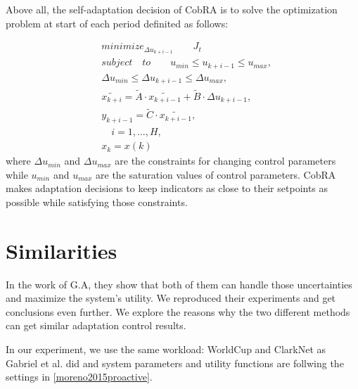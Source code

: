 \documentclass[sigconf]{acmart}
\begin{document}
Above all, the self-adaptation decision of CobRA is to solve the optimization problem at start of each period definited as follows:

\begin{equation}
\begin{aligned}
&minimize_{\Delta u_{k+i-1}}\qquad J_t \\
&subject\quad to \qquad u_{min}\leq u_{k+i-1}\leq u_{max},\\
&{\Delta u_{min}}\leq{ \Delta u_{k+i-1}}\leq {\Delta u_{max}},\\
&\tilde{x_{k+i}}=\tilde{A}\cdot \tilde{x_{k+i-1}}+\tilde{B}\cdot \Delta u_{k+i-1}, \\
&y_{k+i-1}=\tilde{C}\cdot \tilde{x_{k+i-1}},\\
&\quad i=1,...,H,\\
&x_{k}=x(k)
\end{aligned}
\end{equation}
\noindent where $\Delta u_{min}$ and $\Delta u_{max}$ are the constraints for changing control parameters while $u_{min}$ and $u_{max}$ are the saturation values of control parameters. CobRA makes adaptation decisions to keep indicators as close to their setpoints as possible while satisfying those constraints. 

\section{Similarities}
In the work of G.A\cite{moreno2017comparing}, they show that both of them can handle those uncertainties and maximize the system's utility. We reproduced their experiments and get conclusions even further. We explore the reasons why the two different methods can get similar adaptation control results.

In our experiment, we use the same workload: WorldCup\cite{arlitt2000workload} and ClarkNet\cite{arlitt1996web} as Gabriel et al. did and system parameters and utility functions are follwing the settings in \ref{moreno2015proactive}. 
\end{document}
